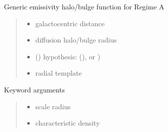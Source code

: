 \documentclass[letterpaper,10pt,english]{sphinxmanual}
\begin{document}
\begin{fulllineitems}
\label{\detokenize{diffsph.profiles:diffsph.profiles.hfactors.Hem_A}}
\pysigstartsignatures
{}
\pysigstopsignatures
\sphinxAtStartPar
Generic emissivity halo/bulge function for Regime A
\begin{quote}\begin{description}
\begin{itemize}
\item {} 
\sphinxAtStartPar
{} \textendash{} galactocentric distance

\item {} 
\sphinxAtStartPar
{} \textendash{} diffusion halo/bulge radius

\item {} 
\sphinxAtStartPar
{} () \textendash{} hypothesis:  (),  or )

\item {} 
\sphinxAtStartPar
{} \textendash{} radial template

\end{itemize}

\end{description}\end{quote}

\sphinxAtStartPar
Keyword arguments
\begin{quote}\begin{description}
\begin{itemize}
\item {} 
\sphinxAtStartPar
{} \textendash{} scale radius

\item {} 
\sphinxAtStartPar
{} \textendash{} characteristic density


\end{itemize}
\end{description}
\end{quote}
\end{fulllineitems}
\end{document}
